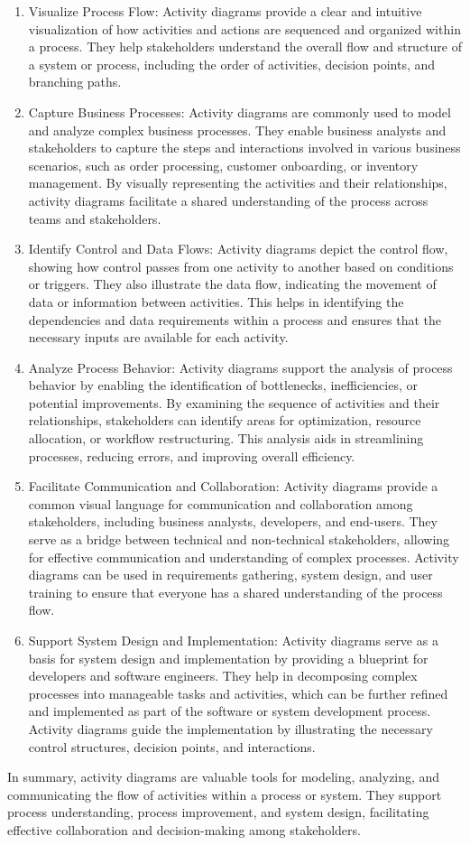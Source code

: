 \documentclass{article}
\begin{document}
\begin{enumerate}
	\item Visualize Process Flow: Activity diagrams provide a clear and intuitive visualization of how activities and actions are sequenced and organized within a process. They help stakeholders understand the overall flow and structure of a system or process, including the order of activities, decision points, and branching paths.
	\item Capture Business Processes: Activity diagrams are commonly used to model and analyze complex business processes. They enable business analysts and stakeholders to capture the steps and interactions involved in various business scenarios, such as order processing, customer onboarding, or inventory management. By visually representing the activities and their relationships, activity diagrams facilitate a shared understanding of the process across teams and stakeholders.
	\item Identify Control and Data Flows: Activity diagrams depict the control flow, showing how control passes from one activity to another based on conditions or triggers. They also illustrate the data flow, indicating the movement of data or information between activities. This helps in identifying the dependencies and data requirements within a process and ensures that the necessary inputs are available for each activity.
	\item Analyze Process Behavior: Activity diagrams support the analysis of process behavior by enabling the identification of bottlenecks, inefficiencies, or potential improvements. By examining the sequence of activities and their relationships, stakeholders can identify areas for optimization, resource allocation, or workflow restructuring. This analysis aids in streamlining processes, reducing errors, and improving overall efficiency.
	\item Facilitate Communication and Collaboration: Activity diagrams provide a common visual language for communication and collaboration among stakeholders, including business analysts, developers, and end-users. They serve as a bridge between technical and non-technical stakeholders, allowing for effective communication and understanding of complex processes. Activity diagrams can be used in requirements gathering, system design, and user training to ensure that everyone has a shared understanding of the process flow.
	\item Support System Design and Implementation: Activity diagrams serve as a basis for system design and implementation by providing a blueprint for developers and software engineers. They help in decomposing complex processes into manageable tasks and activities, which can be further refined and implemented as part of the software or system development process. Activity diagrams guide the implementation by illustrating the necessary control structures, decision points, and interactions.
\end{enumerate}
In summary, activity diagrams are valuable tools for modeling, analyzing, and communicating the flow of activities within a process or system. They support process understanding, process improvement, and system design, facilitating effective collaboration and decision-making among stakeholders.
\end{document}
